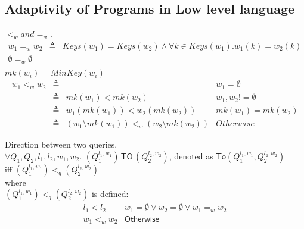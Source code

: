 \documentclass[a4paper,11pt]{article}
\begin{document}
\subsection{Adaptivity of Programs in Low level language}
%
%
\begin{defn}
$<_w and =_w$.\\
\[
  \begin{array}{lll}
     w_1 =_w w_2  &  \triangleq &  Keys(w_1) = Keys(w_2) \land \forall k \in Keys(w_1). w_1(k) = w_2(k) \\
     \emptyset =_w \emptyset & &   \\
  \end{array}
\] 
$mk(w_i) =MinKey(w_i) $ 
\[
\begin{array}{lllr}
     w_1 <_w w_2 & \triangleq & & w_1 = \emptyset \\
     & \triangleq  & mk(w_1) < mk(w_2) & w_1,w_2 != \emptyset  \\
     & \triangleq & w_1(mk(w_1)) < w_2(mk(w_2))   & mk(w_1) = mk(w_2) \\
     & \triangleq & (w_1 \setminus mk(w_1) ) <_w (w_2 \setminus mk(w_2)) & Otherwise
\end{array}
\]
\end{defn}
%
\begin{defn}
Direction between two queries.
\\
$\forall Q_1,Q_2, l_1, l_2, w_1, w_2 $.
$(Q_1^{l_1, w_1}) \, \mathsf{TO} \, (Q_2^{l_2,w_2})$,
denoted as $\mathsf{To}(Q_1^{l_1, w_1}, Q_2^{l_2,w_2})$ \\ iff $(Q_1^{l_1, w_1}) <_q (Q_2^{l_2, w_2})  $\\
where \\
$(Q_1^{l_1, w_1}) <_q (Q_2^{l_2, w_2})$ is defined:\\
\[
\begin{array}{ll}
    l_1 < l_2  & w_1=\emptyset \lor w_2 = \emptyset \lor w_1 =_w w_2   \\
    w_1 <_w w_2    & \mathsf{Otherwise}
\end{array}  
\]
\end{defn}
%
%
\end{document}
